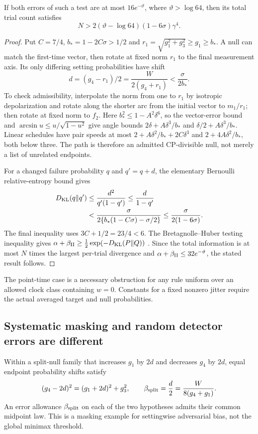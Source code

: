\begin{theorem}\label{thm:information}
If both errors of such a test are at most $16e^{-\vartheta}$, where
$\vartheta>\log64$, then its total trial count satisfies
\[
 N>2(\vartheta-\log64)(1-6\sigma)\gamma^4.
\]
\end{theorem}
\begin{proof}
Put $C=7/4$, $b_*=1-2C\sigma>1/2$ and
$r_1=\sqrt{g_1^2+g_3^2}\geq g_1\geq b_*$.
A null can match the first-time vector, then rotate at fixed norm $r_1$
to the final measurement axis. Its only differing setting probabilities
have shift
\[
 d=(g_4-r_1)/2=\frac{W}{2(g_4+r_1)}<\frac{\sigma}{2b_*}.
\]
To check admissibility, interpolate the norm from one to $r_1$ by isotropic
depolarization and rotate along the shorter arc from the initial vector to
$m_1/r_1$; then rotate at fixed norm to $f_2$.
Here $b_*^2\leq1-A^2\delta^6$, so the vector-error bound and
$\arcsin u\leq u/\sqrt{1-u^2}$ give angle bounds
$2\delta+A\delta^3/b_*$ and $\delta/2+A\delta^3/b_*$.
Linear schedules have pair speeds at most
$2+A\delta^2/b_*+2C\delta^3$ and $2+4A\delta^2/b_*$, both below three.
The path is therefore an admitted CP-divisible null, not merely a list of
unrelated endpoints.

For a changed failure probability $q$ and $q'=q+d$, the elementary
Bernoulli relative-entropy bound gives
\begin{align*}
 D_{\rm KL}(q\Vert q')&\leq\frac{d^2}{q'(1-q')}
 \leq\frac d{1-q'}\\
 &<\frac{\sigma}{2\{b_*(1-C\sigma)-\sigma/2\}}
 \leq\frac{\sigma}{2(1-6\sigma)}.
\end{align*}
The final inequality uses $3C+1/2=23/4<6$.
The Bretagnolle--Huber testing inequality gives
$\alpha+\beta_{\rm II}\geq\tfrac12\exp(-D_{\rm KL}(P\Vert Q))$
\cite[Cor.~4]{Canonne}. Since the total information is at most $N$ times
the largest per-trial divergence and $\alpha+\beta_{\rm II}\leq
32e^{-\vartheta}$, the stated result follows.
\end{proof}
The point-time case is a necessary obstruction for any rule uniform over
an allowed clock class containing $w=0$. Constants for a fixed nonzero
jitter require the actual averaged target and null probabilities.

\subsection{Systematic masking and random detector errors are different}
Within a split-null family that increases $g_1$ by $2d$ and decreases
$g_4$ by $2d$, equal endpoint probability shifts satisfy
\[
 (g_4-2d)^2=(g_1+2d)^2+g_3^2,\qquad
 \beta_{\rm split}=\frac d2=\frac{W}{8(g_4+g_1)}.
\]
An error allowance $\beta_{\rm split}$ on each of the two hypotheses
admits their common midpoint law. This is a masking example for
settingwise adversarial bias, not the global minimax threshold.

